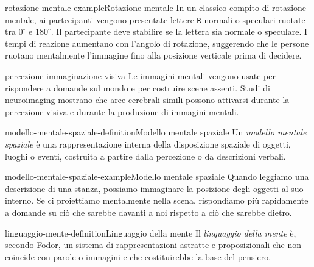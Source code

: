 \documentclass[preview]{standalone}
\begin{document}

\begin{snippetexample}{rotazione-mentale-example}{Rotazione mentale}
    In un classico compito di rotazione mentale, ai partecipanti vengono
    presentate lettere \texttt{R} normali o speculari ruotate tra \(0^\circ\) e
    \(180^\circ\). Il partecipante deve stabilire se la lettera sia normale o
    speculare. I tempi di reazione aumentano con l'angolo di rotazione,
    suggerendo che le persone ruotano mentalmente l'immagine fino alla posizione
    verticale prima di decidere.
\end{snippetexample}


\begin{snippet}{percezione-immaginazione-visiva}
    Le immagini mentali vengono usate per rispondere a domande sul mondo e per
    costruire scene assenti. Studi di neuroimaging mostrano che aree cerebrali
    simili possono attivarsi durante la percezione visiva e durante la
    produzione di immagini mentali.
\end{snippet}


\begin{snippetdefinition}{modello-mentale-spaziale-definition}{Modello mentale spaziale}
    Un \emph{modello mentale spaziale} è una rappresentazione interna della
    disposizione spaziale di oggetti, luoghi o eventi, costruita a partire dalla
    percezione o da descrizioni verbali.
\end{snippetdefinition}

\begin{snippetexample}{modello-mentale-spaziale-example}{Modello mentale spaziale}
    Quando leggiamo una descrizione di una stanza, possiamo immaginare la
    posizione degli oggetti al suo interno. Se ci proiettiamo mentalmente nella
    scena, rispondiamo più rapidamente a domande su ciò che sarebbe davanti a
    noi rispetto a ciò che sarebbe dietro.
\end{snippetexample}


\begin{snippetdefinition}{linguaggio-mente-definition}{Linguaggio della mente}
    Il \emph{linguaggio della mente} è, secondo Fodor, un sistema di
    rappresentazioni astratte e proposizionali che non coincide con parole o
    immagini e che costituirebbe la base del pensiero.
\end{snippetdefinition}
\end{document}
